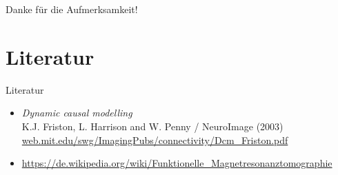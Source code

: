 \documentclass{beamer}
\begin{document}
\begin{frame}
\centering
\huge Danke für die Aufmerksamkeit!
\end{frame}


\section{Literatur}
	\begin{frame}{Literatur}
		\begin{itemize}
			\item \textit{Dynamic causal modelling} \\ {\small K.J. Friston, L. Harrison and W. Penny / NeuroImage (2003)} \\ {\footnotesize \url{web.mit.edu/swg/ImagingPubs/connectivity/Dcm_Friston.pdf}}
			\item \url{https://de.wikipedia.org/wiki/Funktionelle_Magnetresonanztomographie} 
		\end{itemize}
	\end{frame}
\end{document}

